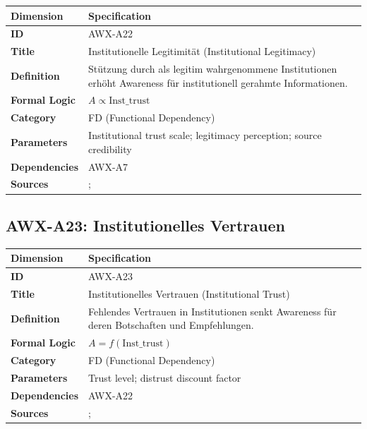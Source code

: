 \begin{table}[htbp]
\small
\begin{tabular}{p{3cm}p{11cm}}
\toprule
\textbf{Dimension} & \textbf{Specification} \\
\midrule
\textbf{ID} & AWX-A22 \\
\textbf{Title} & Institutionelle Legitimität (Institutional Legitimacy) \\
\textbf{Definition} & Stützung durch als legitim wahrgenommene Institutionen erhöht Awareness für institutionell gerahmte Informationen. \\
\textbf{Formal Logic} & $A \propto \text{Inst\_trust}$ \\
\textbf{Category} & FD (Functional Dependency) \\
\textbf{Parameters} & Institutional trust scale; legitimacy perception; source credibility \\
\textbf{Dependencies} & AWX-A7 \\
\textbf{Sources} & \citet{acemoglu2012whynations}; \citet{PAP-PAP-north1990institutionsinstitutions} \\
\bottomrule
\end{tabular}
\end{table}


\subsection{AWX-A23: Institutionelles Vertrauen}

\begin{table}[htbp]
\small
\begin{tabular}{p{3cm}p{11cm}}
\toprule
\textbf{Dimension} & \textbf{Specification} \\
\midrule
\textbf{ID} & AWX-A23 \\
\textbf{Title} & Institutionelles Vertrauen (Institutional Trust) \\
\textbf{Definition} & Fehlendes Vertrauen in Institutionen senkt Awareness für deren Botschaften und Empfehlungen. \\
\textbf{Formal Logic} & $A = f(\text{Inst\_trust})$ \\
\textbf{Category} & FD (Functional Dependency) \\
\textbf{Parameters} & Trust level; distrust discount factor \\
\textbf{Dependencies} & AWX-A22 \\
\textbf{Sources} & \citet{fehr2009economics}; \citet{knack2001trust} \\
\bottomrule
\end{tabular}
\end{table}

